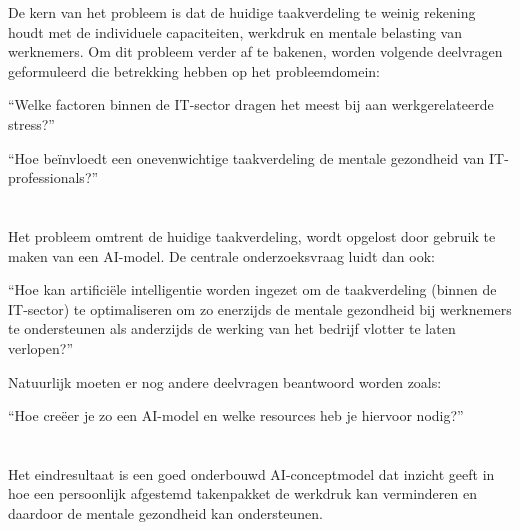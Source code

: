 De kern van het probleem is dat de huidige taakverdeling te weinig rekening houdt met de individuele capaciteiten, werkdruk en mentale belasting van werknemers. Om dit probleem verder af te bakenen, worden volgende deelvragen geformuleerd die betrekking hebben op het probleemdomein:

\vspace{0.5em}``Welke factoren binnen de IT-sector dragen het meest bij aan werkgerelateerde stress?''

\vspace{0.5em}``Hoe beïnvloedt een onevenwichtige taakverdeling de mentale gezondheid van IT-professionals?''

\section{}%
\label{sec:onderzoeksvraag}

Het probleem omtrent de huidige taakverdeling, wordt opgelost door gebruik te maken van een AI-model.
De centrale onderzoeksvraag luidt dan ook:

\vspace{0.5em}``Hoe kan artificiële intelligentie worden ingezet om de taakverdeling (binnen de IT-sector) te optimaliseren om zo enerzijds de mentale gezondheid bij werknemers te ondersteunen als anderzijds de werking van het bedrijf vlotter te laten verlopen?''

\vspace{1em}Natuurlijk moeten er nog andere deelvragen beantwoord worden zoals:

\vspace{0.5em}``Hoe creëer je zo een AI-model en welke resources heb je hiervoor nodig?''

\section{}%
\label{sec:onderzoeksdoelstelling}

Het eindresultaat is een goed onderbouwd AI-conceptmodel dat inzicht geeft in hoe een persoonlijk afgestemd takenpakket de werkdruk kan verminderen en daardoor de mentale gezondheid kan ondersteunen. 

\section{}%
\label{sec:opzet-bachelorproef}

